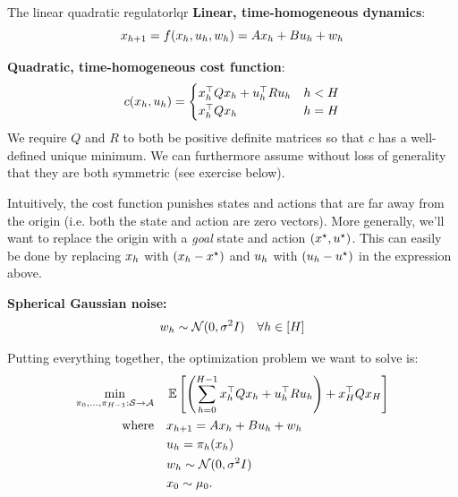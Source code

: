 \documentclass[../main/main]{subfiles}
\begin{document}
\begin{definition}{The linear quadratic regulator}{lqr}
    \textbf{Linear, time-homogeneous dynamics}: \[
        x_{h+1} = f(x_h, u_h, w_h) = A x_h + B u_h + w_h
    \]

    \noindent \textbf{Quadratic, time-homogeneous cost function}:
    \[
        c(x_h, u_h) = \begin{cases}
            x_h^\top Q x_h + u_h^\top R u_h & h < H \\
            x_h^\top Q x_h & h = H
        \end{cases}
    \]
    We require $Q$ and $R$ to both be positive definite matrices so that $c$ has a well-defined unique minimum. We can furthermore assume without loss of generality that they are both symmetric (see exercise below).

    Intuitively, the cost function punishes states and actions that are far away from the origin (i.e. both the state and action are zero vectors). More generally, we'll want to replace the origin with a \emph{goal} state and action $(x^\star, u^\star)$. This can easily be done by replacing $x_h$ with $(x_h - x^\star)$ and $u_h$ with $(u_h - u^\star)$ in the expression above.
    

    \noindent \textbf{Spherical Gaussian noise:} \[ w_h \sim \mathcal{N}(0, \sigma^2 I) \quad \forall h \in [H] \]

    \noindent Putting everything together, the optimization problem we want to solve is:
    \begin{align*}
        \min_{\pi_0, \dots, \pi_{H-1} : \mathcal{S} \to \mathcal{A}} \quad & \operatorname*{\mathbb{E}} \left[ \left( \sum_{h=0}^{H-1} x_h^\top Q x_h + u_h^\top R u_h \right) + x_H^\top Q x_H \right] \\
        \textrm{where} \quad & x_{h+1} = A x_h + B u_h + w_h \\
        & u_h = \pi_h (x_h) \\
        & w_h \sim \mathcal{N}(0, \sigma^2 I) \\
        & x_0 \sim \mu_0.
    \end{align*}
\end{definition}
\end{document}
